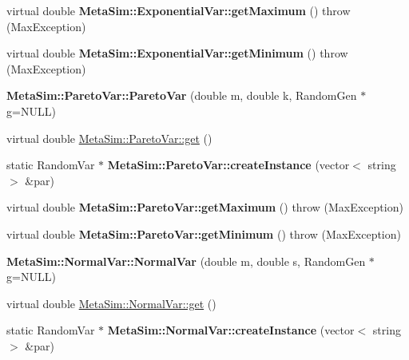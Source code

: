 \begin{DoxyCompactItemize}
\item 
virtual double {\bfseries Meta\+Sim\+::\+Exponential\+Var\+::get\+Maximum} ()  throw (\+Max\+Exception)\hypertarget{group__metasim__random_gacdfbf652d7a0209ff524ed8075746ccc}{}\label{group__metasim__random_gacdfbf652d7a0209ff524ed8075746ccc}

\item 
virtual double {\bfseries Meta\+Sim\+::\+Exponential\+Var\+::get\+Minimum} ()  throw (\+Max\+Exception)\hypertarget{group__metasim__random_ga178ae60910a241c6e16f66388cecf3bf}{}\label{group__metasim__random_ga178ae60910a241c6e16f66388cecf3bf}

\item 
{\bfseries Meta\+Sim\+::\+Pareto\+Var\+::\+Pareto\+Var} (double m, double k, Random\+Gen $\ast$g=N\+U\+LL)\hypertarget{group__metasim__random_ga9395cbfbe6209cbea72af1b7ff33a4b4}{}\label{group__metasim__random_ga9395cbfbe6209cbea72af1b7ff33a4b4}

\item 
virtual double \hyperlink{group__metasim__random_gaf87caabfbe4728672a7eb47e7e7af83b}{Meta\+Sim\+::\+Pareto\+Var\+::get} ()
\item 
static Random\+Var $\ast$ {\bfseries Meta\+Sim\+::\+Pareto\+Var\+::create\+Instance} (vector$<$ string $>$ \&par)\hypertarget{group__metasim__random_gaea903a3c27d80b0d8561821a927068ea}{}\label{group__metasim__random_gaea903a3c27d80b0d8561821a927068ea}

\item 
virtual double {\bfseries Meta\+Sim\+::\+Pareto\+Var\+::get\+Maximum} ()  throw (\+Max\+Exception)\hypertarget{group__metasim__random_gabb1bd247d67432f25e04c00bfdf28dd2}{}\label{group__metasim__random_gabb1bd247d67432f25e04c00bfdf28dd2}

\item 
virtual double {\bfseries Meta\+Sim\+::\+Pareto\+Var\+::get\+Minimum} ()  throw (\+Max\+Exception)\hypertarget{group__metasim__random_gaac777050fb53a06a7a11c546d090ba16}{}\label{group__metasim__random_gaac777050fb53a06a7a11c546d090ba16}

\item 
{\bfseries Meta\+Sim\+::\+Normal\+Var\+::\+Normal\+Var} (double m, double s, Random\+Gen $\ast$g=N\+U\+LL)\hypertarget{group__metasim__random_gaeea8e72562f3b6dd8d4edde7b913d206}{}\label{group__metasim__random_gaeea8e72562f3b6dd8d4edde7b913d206}

\item 
virtual double \hyperlink{group__metasim__random_ga17f84e2aa93a6cf9c5574f4714440c1e}{Meta\+Sim\+::\+Normal\+Var\+::get} ()
\item 
static Random\+Var $\ast$ {\bfseries Meta\+Sim\+::\+Normal\+Var\+::create\+Instance} (vector$<$ string $>$ \&par)\hypertarget{group__metasim__random_ga1e5adca7dd0bd40fea16506323407528}{}\label{group__metasim__random_ga1e5adca7dd0bd40fea16506323407528}


\end{DoxyCompactItemize}
